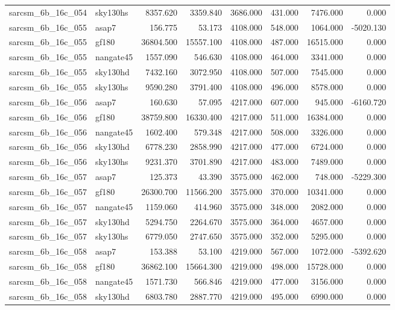\begin{tabular}{llrrrrrr}
sarcsm\_6b\_16c\_054 & sky130hs & 8357.620 & 3359.840 & 3686.000 & 431.000 & 7476.000 & 0.000 \\
sarcsm\_6b\_16c\_055 & asap7 & 156.775 & 53.173 & 4108.000 & 548.000 & 1064.000 & -5020.130 \\
sarcsm\_6b\_16c\_055 & gf180 & 36804.500 & 15557.100 & 4108.000 & 487.000 & 16515.000 & 0.000 \\
sarcsm\_6b\_16c\_055 & nangate45 & 1557.090 & 546.630 & 4108.000 & 464.000 & 3341.000 & 0.000 \\
sarcsm\_6b\_16c\_055 & sky130hd & 7432.160 & 3072.950 & 4108.000 & 507.000 & 7545.000 & 0.000 \\
sarcsm\_6b\_16c\_055 & sky130hs & 9590.280 & 3791.400 & 4108.000 & 496.000 & 8578.000 & 0.000 \\
sarcsm\_6b\_16c\_056 & asap7 & 160.630 & 57.095 & 4217.000 & 607.000 & 945.000 & -6160.720 \\
sarcsm\_6b\_16c\_056 & gf180 & 38759.800 & 16330.400 & 4217.000 & 511.000 & 16384.000 & 0.000 \\
sarcsm\_6b\_16c\_056 & nangate45 & 1602.400 & 579.348 & 4217.000 & 508.000 & 3326.000 & 0.000 \\
sarcsm\_6b\_16c\_056 & sky130hd & 6778.230 & 2858.990 & 4217.000 & 477.000 & 6724.000 & 0.000 \\
sarcsm\_6b\_16c\_056 & sky130hs & 9231.370 & 3701.890 & 4217.000 & 483.000 & 7489.000 & 0.000 \\
sarcsm\_6b\_16c\_057 & asap7 & 125.373 & 43.390 & 3575.000 & 462.000 & 748.000 & -5229.300 \\
sarcsm\_6b\_16c\_057 & gf180 & 26300.700 & 11566.200 & 3575.000 & 370.000 & 10341.000 & 0.000 \\
sarcsm\_6b\_16c\_057 & nangate45 & 1159.060 & 414.960 & 3575.000 & 348.000 & 2082.000 & 0.000 \\
sarcsm\_6b\_16c\_057 & sky130hd & 5294.750 & 2264.670 & 3575.000 & 364.000 & 4657.000 & 0.000 \\
sarcsm\_6b\_16c\_057 & sky130hs & 6779.050 & 2747.650 & 3575.000 & 352.000 & 5295.000 & 0.000 \\
sarcsm\_6b\_16c\_058 & asap7 & 153.388 & 53.100 & 4219.000 & 567.000 & 1072.000 & -5392.620 \\
sarcsm\_6b\_16c\_058 & gf180 & 36862.100 & 15664.300 & 4219.000 & 498.000 & 15728.000 & 0.000 \\
sarcsm\_6b\_16c\_058 & nangate45 & 1571.730 & 566.846 & 4219.000 & 477.000 & 3156.000 & 0.000 \\
sarcsm\_6b\_16c\_058 & sky130hd & 6803.780 & 2887.770 & 4219.000 & 495.000 & 6990.000 & 0.000 \\

\end{tabular}
